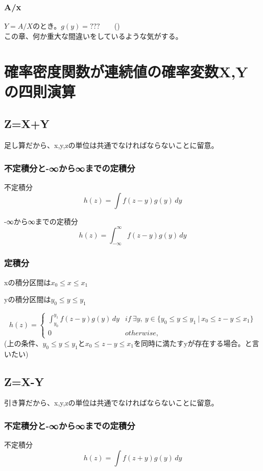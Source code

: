 \documentclass[a4paper,11pt]{ltjsarticle}
\begin{document}
\subsubsection{A/x}
$Y=A/X$のとき。$g(y) = ???$\ \ \ \ ()\\
この章、何か重大な間違いをしているような気がする。
\newpage


\section{確率密度関数が連続値の確率変数X,Yの四則演算}
\subsection{Z=X+Y}
足し算だから、x,y,zの単位は共通でなければならないことに留意。
\subsubsection{不定積分と-∞から∞までの定積分}
不定積分
$$
    h(z) = \int f(z-y) g(y)\,dy
$$

-∞から∞までの定積分
$$
    h(z) = \int_{-\infty}^{\infty} f(z-y) g(y)\,dy
$$
\subsubsection{定積分}
\begin{description}
    \item xの積分区間は$x_0 \leq x \leq x_1$
    \item yの積分区間は$y_0 \leq y \leq y_1$
\end{description}
$$
    h(z)=
    \begin{cases}
        \int_{y_0}^{y_1} f(z-y) g(y)\,dy   & if\ \exists y,\  y\in \{ y_0 \leq y \leq y_1 \ | \ x_0 \leq z-y \leq x_1 \}\\
        0                                   & otherwise,
    \end{cases}
$$
(上の条件、$y_0 \leq y \leq y_1$と$x_0 \leq z-y \leq x_1$を同時に満たすyが存在する場合。と言いたい)


\subsection{Z=X-Y}
引き算だから、x,y,zの単位は共通でなければならないことに留意。
\subsubsection{不定積分と-∞から∞までの定積分}
不定積分
$$
    h(z) = \int f(z+y) g(y)\,dy
$$
\end{document}
